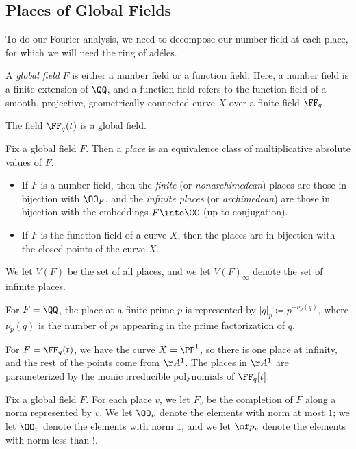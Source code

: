\documentclass[../notes.tex]{subfiles}
\begin{document}
\subsection{Places of Global Fields}
To do our Fourier analysis, we need to decompose our number field at each place, for which we will need the ring of ad\'eles.
\begin{definition}
	A \textit{global field} $F$ is either a number field or a function field. Here, a number field is a finite extension of $\QQ$, and a function field refers to the function field of a smooth, projective, geometrically connected curve $X$ over a finite field $\FF_q$.
\end{definition}
\begin{example}
	The field $\FF_q(t)$ is a global field.
\end{example}
\begin{definition}[place]
	Fix a global field $F$. Then a \textit{place} is an equivalence class of multiplicative absolute values of $F$.
	\begin{itemize}
		\item If $F$ is a number field, then the \textit{finite} (or \textit{nonarchimedean}) places are those in bijection with $\OO_F$, and the \textit{infinite places} (or \textit{archimedean}) are those in bijection with the embeddings $F\into\CC$ (up to conjugation).
		\item If $F$ is the function field of a curve $X$, then the places are in bijection with the closed points of the curve $X$.
	\end{itemize}
	We let $V(F)$ be the set of all places, and we let $V(F)_\infty$ denote the set of infinite places.
\end{definition}
\begin{example}
	For $F=\QQ$, the place at a finite prime $p$ is represented by $\left|q\right|_p\coloneqq p^{-\nu_p(q)}$, where $\nu_p(q)$ is the number of $p$s appearing in the prime factorization of $q$.
\end{example}
\begin{example}
	For $F=\FF_q(t)$, we have the curve $X=\PP^1$, so there is one place at infinity, and the rest of the points come from $\AA^1$. The places in $\AA^1$ are parameterized by the monic irreducible polynomials of $\FF_q[t]$.
\end{example}
\begin{notation}
	Fix a global field $F$. For each place $v$, we let $F_v$ be the completion of $F$ along a norm represented by $v$. We let $\OO_v$ denote the elements with norm at most $1$; we let $\OO_v$ denote the elements with norm $1$, and we let $\mf p_v$ denote the elements with norm less than $!$.
\end{notation}
\end{document}
